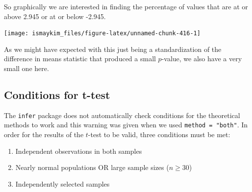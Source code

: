 \documentclass[12pt,]{krantz}
\makeatletter
\newenvironment{Shaded}{\begin{snugshade}}{\end{snugshade}}
\newcommand{\KeywordTok}[1]{\textcolor[rgb]{0.27,0.27,0.27}{\textbf{#1}}}
\newcommand{\DataTypeTok}[1]{\textcolor[rgb]{0.27,0.27,0.27}{#1}}
\newcommand{\StringTok}[1]{\textcolor[rgb]{0.5,0.5,0.5}{#1}}
\newcommand{\OperatorTok}[1]{\textcolor[rgb]{0.43,0.43,0.43}{\textbf{#1}}}
\newcommand{\NormalTok}[1]{#1}
\providecommand{\tightlist}{%
  \setlength{\itemsep}{0pt}\setlength{\parskip}{0pt}}
\newenvironment{kframe}{%
\medskip{}
\setlength{\fboxsep}{.8em}
 \def\at@end@of@kframe{}%
 \ifinner\ifhmode%
  \def\at@end@of@kframe{\end{minipage}}%
  \begin{minipage}{\columnwidth}%
 \fi\fi%
 \def\FrameCommand##1{\hskip\@totalleftmargin \hskip-\fboxsep
 \colorbox{shadecolor}{##1}\hskip-\fboxsep
     \hskip-\linewidth \hskip-\@totalleftmargin \hskip\columnwidth}%
 \MakeFramed {\advance\hsize-\width
   \@totalleftmargin\z@ \linewidth\hsize
   \@setminipage}}%
 {\par\unskip\endMakeFramed%
 \at@end@of@kframe}
\renewenvironment{Shaded}{\begin{kframe}}{\end{kframe}}
\makeatother
\begin{document}
\begin{Shaded}
\end{Shaded}

So graphically we are interested in finding the percentage of values
that are at or above 2.945 or at or below -2.945.

\begin{Shaded}
\end{Shaded}

\begin{center}\texttt{[image: ismaykim\_files/figure-latex/unnamed-chunk-416-1]} \end{center}

As we might have expected with this just being a standardization of the
difference in means statistic that produced a small \(p\)-value, we also
have a very small one here.

\subsection{Conditions for t-test}\label{conditions-for-t-test}

The \texttt{infer} package does not automatically check conditions for
the theoretical methods to work and this warning was given when we used
\texttt{method\ =\ "both"}. In order for the results of the \(t\)-test
to be valid, three conditions must be met:

\begin{enumerate}
\def\labelenumi{\arabic{enumi}.}
\tightlist
\item
  Independent observations in both samples
\item
  Nearly normal populations OR large sample sizes (\(n \ge 30\))
\item
  Independently selected samples
\end{enumerate}
\end{document}
